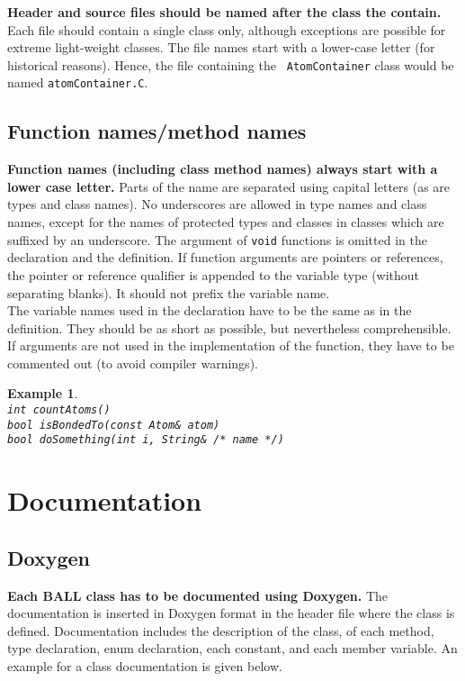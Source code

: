 \documentclass[a4]{article}
\newtheorem{example}{Example}
\begin{document}
{\bf Header and source files should be named after the class the contain.}
Each file should contain a single class only, although exceptions are possible
for extreme light-weight classes. The file names start with a lower-case
letter (for historical reasons). Hence, the file containing the {\tt
AtomContainer} class would be named {\tt atomContainer.C}.

\subsection{Function names/method names}

{\bf Function names (including class method names) always start with a lower case
letter.} Parts of the name are separated using capital letters (as are types
and class names). No underscores are allowed in type names and class names,
except for the names of protected types and classes in classes which are
suffixed by an underscore. The argument of {\tt void} functions is omitted in
the declaration and the definition. If function arguments are pointers or
references, the pointer or reference qualifier is appended to the variable
type (without separating blanks). It should not prefix the variable name.\\
The variable names used in the declaration have to be the same as in the
definition. They should be as short as possible, but nevertheless
comprehensible.  If arguments are not used in the implementation of the
function, they have to be commented out (to avoid compiler warnings).
\begin{example}\hspace*{2mm}\\
{\tt int countAtoms()}\\
{\tt bool isBondedTo(const Atom\& atom)}\\
{\tt bool doSomething(int i, String\& /* name */)}
\end{example}

\section{Documentation}

\subsection{Doxygen}
{\bf Each BALL class has to be documented using Doxygen.} The documentation is
inserted in Doxygen format in the header file where the class is defined.
Documentation includes the description of the class, of each method, type
declaration, enum declaration, each constant, and each member variable.
An example for a class documentation is given below. 
\end{document}
